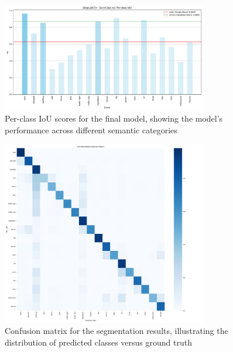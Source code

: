 \documentclass[]{article}
\begin{document}
\begin{figure}[htbp]
    \centering
    \includegraphics[width=0.8\textwidth]{outputs/deeplabv3plus_test_results/per_class_iou.png}
    \caption{Per-class IoU scores for the final model, showing the model's performance across different semantic categories}
    \label{fig:per_class_iou}
\end{figure}

\begin{figure}[htbp]
    \centering
    \includegraphics[width=0.8\textwidth]{outputs/deeplabv3plus_test_results/full_confusion_matrix.png}
    \caption{Confusion matrix for the segmentation results, illustrating the distribution of predicted classes versus ground truth}
    \label{fig:confusion_matrix}
\end{figure}
\end{document}
